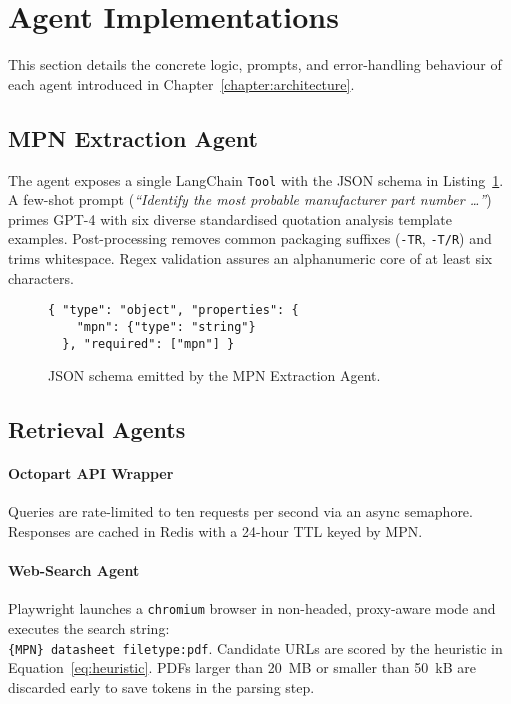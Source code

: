 \section{Agent Implementations}
This section details the concrete logic, prompts, and error-handling behaviour of each agent introduced in Chapter~\ref{chapter:architecture}.

\subsection{MPN Extraction Agent}
The agent exposes a single LangChain \texttt{Tool} with the JSON schema in Listing~\ref{lst:mpn_schema}.  A few-shot prompt (\emph{``Identify the most probable manufacturer part number …''}) primes GPT-4 with six diverse standardised quotation analysis template examples.  Post-processing removes common packaging suffixes (\texttt{-TR}, \texttt{-T/R}) and trims whitespace.  Regex validation assures an alphanumeric core of at least six characters.
\begin{figure}[H]
\centering
\begin{minipage}{0.9\textwidth}
\begin{verbatim}
{ "type": "object", "properties": {
    "mpn": {"type": "string"}
  }, "required": ["mpn"] }
\end{verbatim}
\end{minipage}
\caption{JSON schema emitted by the MPN Extraction Agent.}
\label{lst:mpn_schema}
\end{figure}

\subsection{Retrieval Agents}
\paragraph{Octopart API Wrapper}  Queries are rate-limited to ten requests per second via an async semaphore.  Responses are cached in Redis with a 24-hour TTL keyed by MPN.

\paragraph{Web-Search Agent}  Playwright launches a \texttt{chromium} browser in non-headed, proxy-aware mode and executes the search string:\\
\texttt{\{MPN\} datasheet filetype:pdf}.  Candidate URLs are scored by the heuristic in Equation~\ref{eq:heuristic}.  PDFs larger than 20~MB or smaller than 50~kB are discarded early to save tokens in the parsing step.

